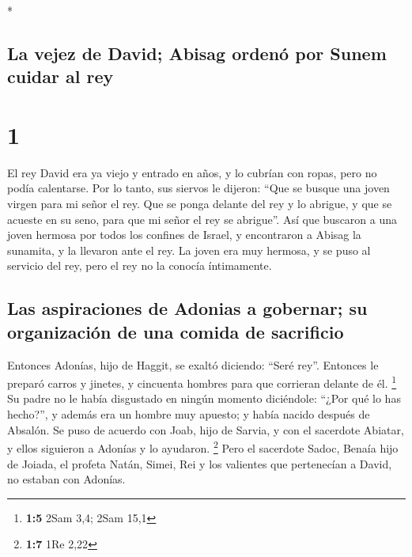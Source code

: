 \begin{paracol}{2} \switchcolumn[0]*

\hypertarget{la-vejez-de-david-abisag-ordenuxf3-por-sunem-cuidar-al-rey}{%
\subsection{La vejez de David; Abisag ordenó por Sunem cuidar al
rey}\label{la-vejez-de-david-abisag-ordenuxf3-por-sunem-cuidar-al-rey}}

\hypertarget{section}{%
\section{1}\label{section}}

 El rey David era ya viejo y entrado en años, y lo cubrían
con ropas, pero no podía calentarse.  Por lo tanto, sus
siervos le dijeron: ``Que se busque una joven virgen para mi señor el
rey. Que se ponga delante del rey y lo abrigue, y que se acueste en su
seno, para que mi señor el rey se abrigue''.  Así que
buscaron a una joven hermosa por todos los confines de Israel, y
encontraron a Abisag la sunamita, y la llevaron ante el rey.
 La joven era muy hermosa, y se puso al servicio del rey,
pero el rey no la conocía íntimamente.

\hypertarget{las-aspiraciones-de-adonias-a-gobernar-su-organizaciuxf3n-de-una-comida-de-sacrificio}{%
\subsection{Las aspiraciones de Adonias a gobernar; su organización de
una comida de
sacrificio}\label{las-aspiraciones-de-adonias-a-gobernar-su-organizaciuxf3n-de-una-comida-de-sacrificio}}

 Entonces Adonías, hijo de Haggit, se exaltó diciendo:
``Seré rey''. Entonces le preparó carros y jinetes, y cincuenta hombres
para que corrieran delante de él. \footnote{\textbf{1:5} 2Sam 3,4; 2Sam
  15,1}  Su padre no le había disgustado en ningún momento
diciéndole: ``¿Por qué lo has hecho?'', y además era un hombre muy
apuesto; y había nacido después de Absalón.  Se puso de
acuerdo con Joab, hijo de Sarvia, y con el sacerdote Abiatar, y ellos
siguieron a Adonías y lo ayudaron. \footnote{\textbf{1:7} 1Re 2,22}
 Pero el sacerdote Sadoc, Benaía hijo de Joiada, el
profeta Natán, Simei, Rei y los valientes que pertenecían a David, no
estaban con Adonías.


\end{paracol}
